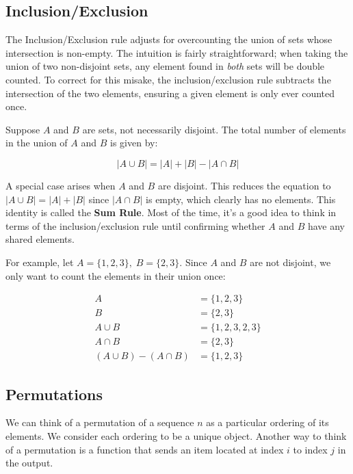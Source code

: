 \documentclass{standlone}
\begin{document}
\subsection{Inclusion/Exclusion}

The Inclusion/Exclusion rule adjusts for overcounting the union of sets whose
intersection is non-empty. The intuition is fairly straightforward; when taking
the union of two non-disjoint sets, any element found in \emph{both} sets will
be double counted. To correct for this misake, the inclusion/exclusion rule
subtracts the intersection of the two elements, ensuring a given element is only
ever counted once.

\begin{theorem}
  Suppose $A$ and $B$ are sets, not necessarily disjoint. The total number of
  elements in the union of $A$ and $B$ is given by:

  \[
    |A \cup B| = |A| + |B| - |A \cap B|
  \]
\end{theorem}

A special case arises when $A$ and $B$ are disjoint. This reduces the equation
to $|A \cup B| = |A| + |B|$ since $|A \cap B|$ is empty, which clearly has no
elements. This identity is called the \textbf{Sum Rule}. Most of the time, it's
a good idea to think in terms of the inclusion/exclusion rule until confirming
whether $A$ and $B$ have any shared elements.

\begin{example}
  For example, let $A = \{1, 2, 3\}, \; B = \{2, 3\}$. Since $A$ and $B$ are not
  disjoint, we only want to count the elements in their union once:

  \begin{align*}
    A &= \{1, 2, 3\} \\
    B &= \{2, 3\} \\
    A \cup B &= \{1, 2, 3, 2, 3\} \\
    A \cap B &= \{2, 3\} \\
    (A \cup B) - (A \cap B) &= \{1, 2, 3\}
  \end{align*}
\end{example}

\subsection{Permutations}

We can think of a permutation of a sequence $n$ as a particular ordering of
its elements. We consider each ordering to be a unique object. Another way to
think of a permutation is a function that sends an item located at index $i$ to
index $j$ in the output.
\end{document}
